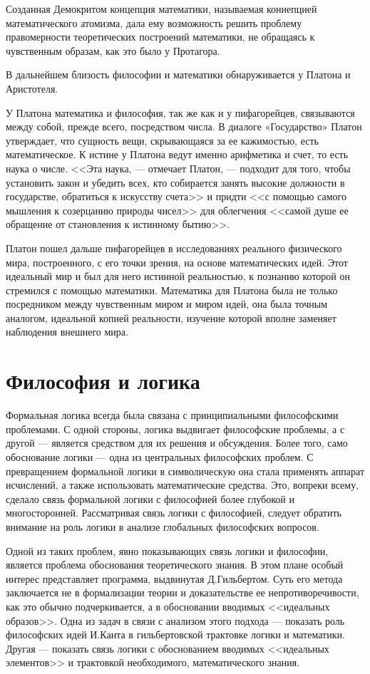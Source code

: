 \documentclass[a4page]{article}
\begin{document}
Созданная Демокритом концепция математики, называемая кониепцией математического атомизма,
дала ему возможность решить проблему правомерности теоретических построений математики,
не обращаясь к чувственным образам, как это было у Протагора.

В дальнейшем близость философии и математики обнаруживается у Платона и Аристотеля.

У Платона математика и философия, так же как и у пифагорейцев,
связываются между собой, прежде всего, посредством числа.
В диалоге «Государство» Платон утверждает, что сущность вещи,
скрывающаяся за ее кажимостью, есть математическое.
К истине у Платона ведут именно арифметика и счет, то есть наука о числе.
<<Эта наука, --- отмечает Платон, --- подходит для того,
чтобы установить закон и убедить всех,
кто собирается занять высокие должности в государстве, обратиться к искусству счета>>
и придти <<с помощью самого мышления к созерцанию природы чисел>>
для облегчения <<самой душе ее обращение от становления к истинному бытию>>. %

Платон пошел дальше пифагорейцев в исследованиях реального физического мира,
построенного, с его точки зрения, на основе математических идей.
Этот идеальный мир и был для него истинной реальностью,
к познанию которой он стремился с помощью математики.
Математика для Платона была не только посредником между чувственным миром и миром идей,
она была точным аналогом, идеальной копией реальности,
изучение которой вполне заменяет наблюдения внешнего мира.

\section{Философия и логика}
Формальная логика всегда была связана с принципиальными философскими проблемами.
С одной стороны, логика выдвигает философские проблемы,
а с другой --- является средством для их решения и обсуждения.
Более того, само обоснование логики --- одна из центральных философских проблем.
С превращением формальной логики в символическую она стала применять аппарат исчислений,
а также использовать математические средства.
Это, вопреки всему, сделало связь формальной логики с философией
более глубокой и многосторонней.
Рассматривая связь логики с философией,
следует обратить внимание на роль логики в анализе глобальных философских вопросов.

Одной из таких проблем, явно показывающих связь логики и философии,
является проблема обоснования теоретического знания.
В этом плане особый интерес представляет программа, выдвинутая Д.Гильбертом. %
Суть его метода заключается не в формализации теории и доказательстве ее непротиворечивости,
как это обычно подчеркивается, а в обосновании вводимых <<идеальных образов>>.
Одна из задач в связи с анализом этого подхода ---
показать роль философских идей И.Канта в гильбертовской трактовке логики и математики.
Другая --- показать связь логики с обоснованием вводимых <<идеальных элементов>>
и трактовкой необходимого, математического знания.
\end{document}
